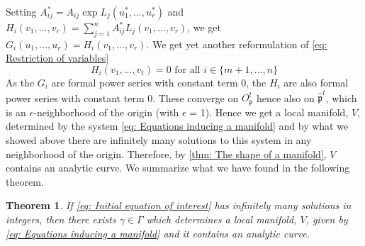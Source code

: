 \documentclass{article}
\newtheorem{theorem}{Theorem}[section]
\newcommand{\mfrak}[1]{\mathfrak{#1}}
\numberwithin{equation}{section}
\begin{document}
Setting $A_{ij}^* = A_{ij} \exp L_j(u_1^*, ..., u_r^*)$ and $H_i(v_1, ..., v_r) = \sum_{j = 1}^n A_{ij}^* L_j(v_1, ..., v_r)$, we get
$G_i(u_1, ..., u_r) = H_i(v_1, ..., v_r)$. We get yet another reformulation of \cref{eq: Restriction of variables}
\begin{equation}\label{eq: Equations inducing a manifold}
    H_i(v_1, ..., v_t) = 0 \text{ for all } i \in \{m+1, ..., n\}
\end{equation}
As the $G_i$ are formal power series with constant term 0, the $H_i$ are also formal power series with constant term 0. These converge on $O_\mfrak p^t$ hence also on $\hat {\mfrak p}^t$, which is an $\epsilon$-neighborhood of the origin (with $\epsilon$ = 1). Hence we get a local manifold, $V$, determined by the system \cref{eq: Equations inducing a manifold} and by what we showed above there are infinitely many solutions to this system in any neighborhood of the origin. Therefore, by \cref{thm: The shape of a manifold}, $V$ contains an analytic curve. We summarize what we have found in the following theorem. 
\begin{theorem}\label{thm: Skolems method}
    If \cref{eq: Initial equation of interest} has infinitely many solutions in integers, then there exists $\gamma \in \Gamma$ which determines a local manifold, $V$, given by \cref{eq: Equations inducing a manifold} and it contains an analytic curve.
\end{theorem}
\end{document}
